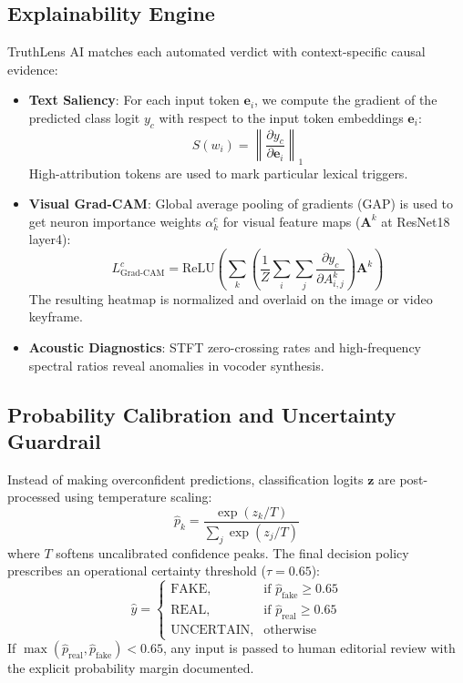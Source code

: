 \documentclass[conference]{IEEEtran}
\begin{document}
\subsection{Explainability Engine}
TruthLens AI matches each automated verdict with context-specific causal evidence:
\begin{itemize}
    \item \textbf{Text Saliency}: For each input token $\mathbf{e}_i$, we compute the gradient of the predicted class logit $y_c$ with respect to the input token embeddings $\mathbf{e}_i$:
    \begin{equation}
    S(w_i) = \left\| \frac{\partial y_c}{\partial \mathbf{e}_i} \right\|_1
    \end{equation}
    High-attribution tokens are used to mark particular lexical triggers.
    \item \textbf{Visual Grad-CAM}: Global average pooling of gradients (GAP) is used to get neuron importance weights $\alpha_k^c$ for visual feature maps ($\mathbf{A}^k$ at ResNet18 layer4):
    \begin{equation}
    L_{\text{Grad-CAM}}^c = \text{ReLU}\left( \sum_k \left( \frac{1}{Z} \sum_{i} \sum_{j} \frac{\partial y_c}{\partial A_{i,j}^k} \right) \mathbf{A}^k \right)
    \end{equation}
    The resulting heatmap is normalized and overlaid on the image or video keyframe.
    \item \textbf{Acoustic Diagnostics}: STFT zero-crossing rates and high-frequency spectral ratios reveal anomalies in vocoder synthesis.
\end{itemize}

\subsection{Probability Calibration and Uncertainty Guardrail}
Instead of making overconfident predictions, classification logits $\mathbf{z}$ are post-processed using temperature scaling:
\begin{equation}
\hat{p}_k = \frac{\exp(z_k / T)}{\sum_{j} \exp(z_j / T)}
\end{equation}
where $T$ softens uncalibrated confidence peaks. The final decision policy prescribes an operational certainty threshold ($\tau = 0.65$):
\begin{equation}
\hat{y} = \begin{cases}
\text{FAKE}, & \text{if } \hat{p}_{\text{fake}} \ge 0.65 \\
\text{REAL}, & \text{if } \hat{p}_{\text{real}} \ge 0.65 \\
\text{UNCERTAIN}, & \text{otherwise}
\end{cases}
\end{equation}
If $\max(\hat{p}_{\text{real}}, \hat{p}_{\text{fake}}) < 0.65$, any input is passed to human editorial review with the explicit probability margin documented.
\end{document}
